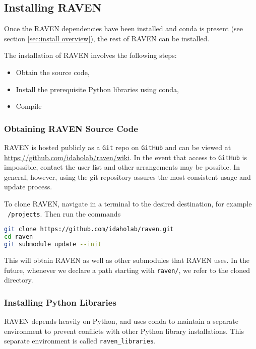 \subsection{Installing RAVEN}
\label{sec:clone raven}

Once the RAVEN dependencies have been installed  and conda is present
(see section \ref{sec:install overview}), the rest of RAVEN can be installed.

The installation of RAVEN involves the following steps:
\begin{itemize}
  \item Obtain the source code,
  \item Install the prerequisite Python libraries using conda,
  \item Compile
\end{itemize}




\subsubsection{Obtaining RAVEN Source Code}
RAVEN is hosted publicly as a \texttt{Git} repo on \texttt{GitHub}
and can be viewed at \url{https://github.com/idaholab/raven/wiki}.
In the event that access to \texttt{GitHub} is impossible, contact the user list and other arrangements may be
possible.  In general, however, using the git repository assures the most consistent usage and update process.

To clone RAVEN, navigate in a terminal to the desired destination, for example \texttt{~/projects}.  Then run
the commands
\begin{lstlisting}[language=bash]
git clone https://github.com/idaholab/raven.git
cd raven
git submodule update --init
\end{lstlisting}
This will obtain RAVEN as well as other submodules that RAVEN uses.  In the future, whenever we declare a path
starting with \texttt{raven/}, we refer to the cloned directory.




\subsubsection{Installing Python Libraries}
RAVEN depends heavily on Python, and uses conda to maintain a separate environment to prevent conflicts with
other Python library installations.  This separate environment is called \texttt{raven\_libraries}.

